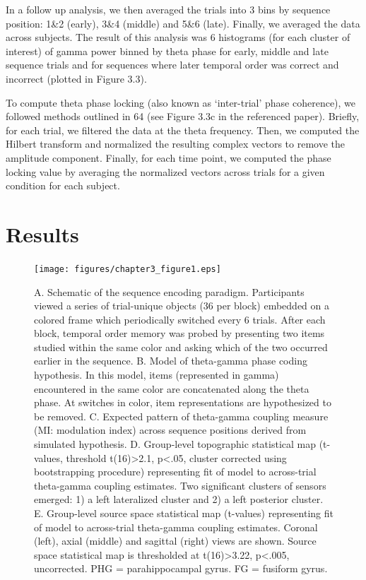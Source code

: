 In a follow up analysis, we then averaged the trials into 3 bins by
sequence position: 1\&2 (early), 3\&4 (middle) and 5\&6 (late). Finally,
we averaged the data across subjects. The result of this analysis was 6
histograms (for each cluster of interest) of gamma power binned by theta
phase for early, middle and late sequence trials and for sequences where
later temporal order was correct and incorrect (plotted in Figure 3.3).

To compute theta phase locking (also known as `inter-trial' phase
coherence), we followed methods outlined in 64 (see Figure 3.3c in the
referenced paper). Briefly, for each trial, we filtered the data at the
theta frequency. Then, we computed the Hilbert transform and normalized
the resulting complex vectors to remove the amplitude component.
Finally, for each time point, we computed the phase locking value by
averaging the normalized vectors across trials for a given condition for
each subject.

\section{Results}\label{results}

\begin{figure}
  \centering
  \texttt{[image: figures/chapter3\_figure1.eps]}
  \caption[Theta-gamma coupling analysis and model fits.]{A. Schematic of the sequence encoding paradigm.  Participants viewed a series of trial-unique objects (36 per block) embedded on a colored frame which periodically switched every 6 trials.  After each block, temporal order memory was probed by presenting two items studied within the same color and asking which of the two occurred earlier in the sequence. B. Model of theta-gamma phase coding hypothesis. In this model, items (represented in gamma) encountered in the same color are concatenated along the theta phase.  At switches in color, item representations are hypothesized to be removed.  C. Expected pattern of theta-gamma coupling measure (MI: modulation index) across sequence positions derived from simulated hypothesis.  D. Group-level topographic statistical map (t-values, threshold t(16)>2.1, p<.05, cluster corrected using bootstrapping procedure) representing fit of model to across-trial theta-gamma coupling estimates. Two significant clusters of sensors emerged: 1) a left lateralized cluster and 2) a left posterior cluster. E. Group-level source space statistical map (t-values) representing fit of model to across-trial theta-gamma coupling estimates.  Coronal (left), axial (middle) and sagittal (right) views are shown.  Source space statistical map is thresholded at t(16)>3.22, p<.005, uncorrected. PHG = parahippocampal gyrus.  FG = fusiform gyrus.}
  \label{chapter3_figure1}
\end{figure}

